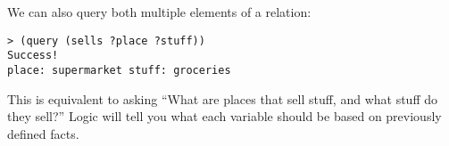 We can also query both multiple elements of a relation:

\begin{lstlisting}
> (query (sells ?place ?stuff))
Success!
place: supermarket stuff: groceries
\end{lstlisting}

This is equivalent to asking ``What are places that sell stuff, and what stuff
do they sell?''  Logic will tell you what each variable should be based on
previously defined facts.






